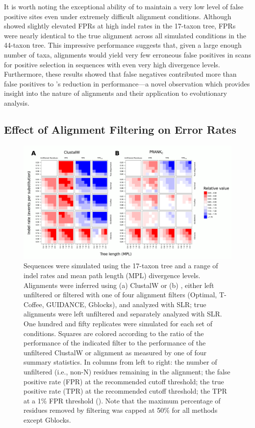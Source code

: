 \documentclass{article}
\begin{document}
It is worth noting the exceptional ability of \prankc to maintain a
very low level of false positive sites even under extremely difficult
alignment conditions. Although \prankc showed slightly elevated FPRs
at high indel rates in the 17-taxon tree, FPRs were nearly identical
to the true alignment across all simulated conditions in the 44-taxon
tree. This impressive performance suggests that, given a large enough
number of taxa, \prankc alignments would yield very few erroneous
false positives in scans for positive selection in sequences with even very
high divergence levels. Furthermore, these results showed that false
negatives contributed more than false positives to \prankc{}'s
reduction in \sw performance---a novel observation which provides
insight into the nature of \prankc alignments and their application to
\sw evolutionary analysis.

\subsection*{Effect of Alignment Filtering on \Sw Error Rates}

\begin{figure}[t]
\begin{center}
\includegraphics[scale=0.65]{fig5.pdf}
\end{center}
\caption{Sequences were simulated using the 17-taxon tree and a range
  of indel rates and mean path length (MPL) divergence
  levels. Alignments were inferred using (a) ClustalW or (b) \prankc,
  either left unfiltered or filtered with one of four alignment
  filters (Optimal, T-Coffee, GUIDANCE, Gblocks), and analyzed with
  SLR; true alignments were left unfiltered and separately analyzed
  with SLR. One hundred and fifty replicates were simulated for each
  set of conditions. Squares are colored according to the ratio of the
  performance of the indicated filter to the performance of the
  unfiltered ClustalW or \prankc alignment as measured by one of four
  summary statistics. In columns from left to right: the number of
  unfiltered (i.e., non-N) residues remaining in the alignment; the
  false positive rate (FPR) at the recommended cutoff threshold; the
  true positive rate (TPR) at the recommended cutoff threshold; the
  TPR at a 1\% FPR threshold (\tpr). Note that the maximum percentage
  of residues removed by filtering was capped at 50\% for all methods
  except Gblocks.}
\label{fig_5}
\end{figure}
\end{document}
